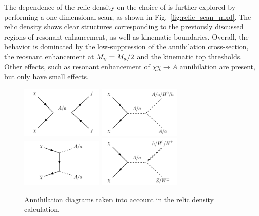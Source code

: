 The dependence of the relic density on the choice of \mDM is further explored by performing a one-dimensional scan, as shown in Fig.~\ref{fig:relic_scan_mxd}. The relic density shows clear structures corresponding to the previously discussed regions of resonant enhancement, as well as kinematic boundaries. Overall, the behavior is dominated by the low-\mDM suppression of the annihilation cross-section, the reosnant enhancement at $M_{\chi} = M_{a}/2$ and the kinematic top thresholds. Other effects, such as resonant enhancement of $\chi\chi\rightarrow A$ annihilation are present, but only have small effects.

\begin{figure}[h]
\centering
\includegraphics[width=0.35\textwidth]{texinputs/05_relic/figures/feynman/graph_2hdm_relic_s_fermions.pdf}
\includegraphics[width=0.35\textwidth]{texinputs/05_relic/figures/feynman/graph_2hdm_relic_s_bosons.pdf}
\includegraphics[width=0.35\textwidth]{texinputs/05_relic/figures/feynman/graph_2hdm_relic_ss_bosons.pdf}
\includegraphics[width=0.35\textwidth]{texinputs/05_relic/figures/feynman/graph_2hdm_relic_s_vbosons.pdf}

\caption{Annihilation diagrams taken into account in the relic density calculation.}
\label{fig:feyn_annihilation}
\end{figure}

